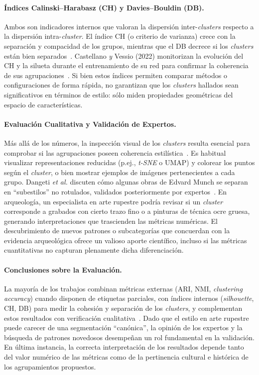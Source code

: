 \paragraph{Índices Calinski–Harabasz (CH) y Davies–Bouldin (DB).}
Ambos son indicadores internos que valoran la dispersión inter-\textit{clusters} respecto a la dispersión intra-\textit{cluster}.
El índice CH (o criterio de varianza) crece con la separación y compacidad de los grupos, mientras que el DB decrece si los \textit{clusters} están bien separados~\cite{dangeti2024}.
Castellano \textit{y} Vessio (2022) monitorizan la evolución del CH y la silueta durante el entrenamiento de su red para confirmar la coherencia de sus agrupaciones~\cite{castellano2022}.
Si bien estos índices permiten comparar métodos o configuraciones de forma rápida, no garantizan que los \textit{clusters} hallados sean significativos en términos de estilo: sólo miden propiedades geométricas del espacio de características.

\paragraph{Evaluación Cualitativa y Validación de Expertos.}
Más allá de los números, la inspección visual de los \textit{clusters} resulta esencial para comprobar si las agrupaciones poseen coherencia estilística~\cite{gultepe2018}.
Es habitual visualizar representaciones reducidas (p.ej., \textit{t-SNE} o UMAP) y colorear los puntos según el \textit{cluster}, o bien mostrar ejemplos de imágenes pertenecientes a cada grupo.
Dangeti \textit{et al.} discuten cómo algunas obras de Edvard Munch se separan en “subestilos” no rotulados, validados posteriormente por expertos~\cite{dangeti2024}.
En arqueología, un especialista en arte rupestre podría revisar si un \textit{cluster} corresponde a grabados con cierto trazo fino o a pinturas de técnica ocre gruesa, generando interpretaciones que trascienden las métricas numéricas.
El descubrimiento de nuevos patrones o subcategorías que concuerdan con la evidencia arqueológica ofrece un valioso aporte científico, incluso si las métricas cuantitativas no capturan plenamente dicha diferenciación.

\paragraph{Conclusiones sobre la Evaluación.}
La mayoría de los trabajos combinan métricas externas (ARI, NMI, \textit{clustering accuracy}) cuando disponen de etiquetas parciales, con índices internos (\textit{silhouette}, CH, DB) para medir la cohesión y separación de los \textit{clusters}, y complementan estos resultados con verificación cualitativa~\cite{guerin2018,dangeti2024}.
Dado que el estilo en arte rupestre puede carecer de una segmentación “canónica”, la opinión de los expertos y la búsqueda de patrones novedosos desempeñan un rol fundamental en la validación.
En última instancia, la correcta interpretación de los resultados depende tanto del valor numérico de las métricas como de la pertinencia cultural e histórica de los agrupamientos propuestos.

